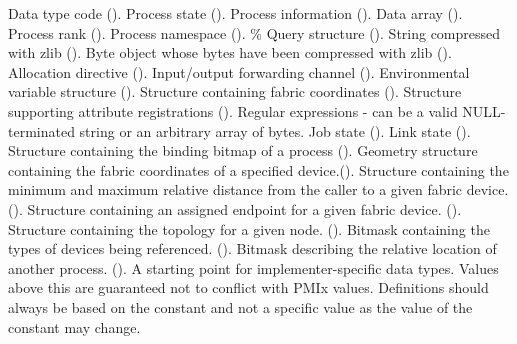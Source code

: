 \begin{constantdesc}
%
Data type code ().
%
Process state ().
%
Process information ().
%
Data array ().
%
Process rank ().
%
Process namespace ().
\%
Query structure ().
%
String compressed with zlib ().
%
Byte object whose bytes have been compressed with zlib ().
%
Allocation directive ().
%
Input/output forwarding channel ().
%
Environmental variable structure ().
%
Structure containing fabric coordinates ().
%
Structure supporting attribute registrations ().
%
Regular expressions - can be a valid NULL-terminated string or an arbitrary array of bytes.
%
Job state ().
%
Link state ().
%
Structure containing the binding bitmap of a process ().
%
Geometry structure containing the fabric coordinates of a specified device.().
%
Structure containing the minimum and maximum relative distance from the caller to a given fabric device. ().
%
Structure containing an assigned endpoint for a given fabric device. ().
%
Structure containing the topology for a given node. ().
%
Bitmask containing the types of devices being referenced. ().
%
Bitmask describing the relative location of another process. ().
%
A starting point for implementer-specific data types.
Values above this are guaranteed not to conflict with \ac{PMIx} values.
Definitions should always be based on the  constant and not a specific value as the value of the constant may change.
%
\end{constantdesc}


